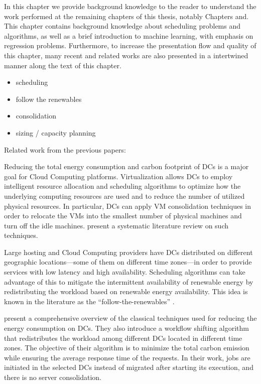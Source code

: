 In this chapter we provide background knowledge to the reader to understand the work performed at the remaining chapters of this thesis, notably Chapters and. This chapter contains background knowledge about scheduling problems and algorithms, as well as a brief introduction to machine learning, with emphasis on regression problems. Furthermore, to increase the presentation flow and quality of this chapter, many recent and related works are also presented in a intertwined manner along the text of this chapter.

\begin{itemize}
    \item scheduling
    \item follow the renewables
    \item consolidation
    \item sizing / capacity planning
\end{itemize}



Related work from the previous papers:

Reducing the total energy consumption and carbon footprint of DCs is a
major goal for Cloud Computing platforms. Virtualization allows DCs to
employ intelligent resource allocation and scheduling algorithms to
optimize how the underlying computing resources are used and to reduce
the number of utilized physical resources. In particular, DCs can apply VM
consolidation techniques in order to relocate the VMs into the
smallest number of physical machines and turn off the idle
machines. \cite{10.1145/3470972} present a systematic literature
review on such techniques.

Large hosting and Cloud Computing providers have DCs distributed on
different geographic locations---some of them on different time
zones---in order to provide services with low latency and high
availability. Scheduling algorithms can take advantage of this to
mitigate the intermittent availability of renewable energy by
redistributing the workload based on renewable energy
availability. This idea is known in the literature as the
``follow-the-renewables'' \cite{shuja2016sustainable}. 

\cite{XU2020191} present a comprehensive overview of the classical
techniques used for reducing the energy consumption on DCs. They also
introduce a workflow shifting algorithm that redistributes the
workload among different DCs located in different time zones. The
objective of their algorithm is to minimize the total carbon emission
while ensuring the average response time of the requests. In their
work, jobs are initiated in the selected DCs instead of migrated after
starting its execution, and there is no server consolidation.


